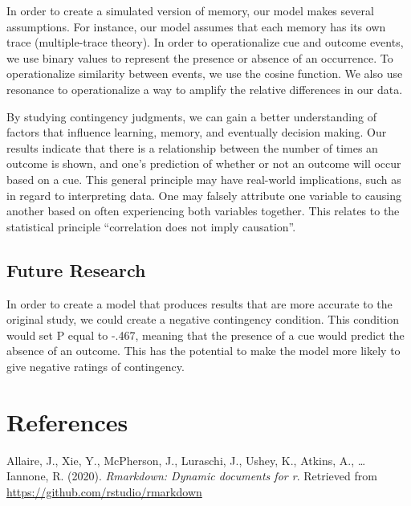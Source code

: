 \documentclass[
  english,
  man,floatsintext]{apa6}
\begin{document}
In order to create a simulated version of memory, our model makes several assumptions. For instance, our model assumes that each memory has its own trace (multiple-trace theory). In order to operationalize cue and outcome events, we use binary values to represent the presence or absence of an occurrence. To operationalize similarity between events, we use the cosine function. We also use resonance to operationalize a way to amplify the relative differences in our data.

By studying contingency judgments, we can gain a better understanding of factors that influence learning, memory, and eventually decision making. Our results indicate that there is a relationship between the number of times an outcome is shown, and one's prediction of whether or not an outcome will occur based on a cue. This general principle may have real-world implications, such as in regard to interpreting data. One may falsely attribute one variable to causing another based on often experiencing both variables together. This relates to the statistical principle \enquote{correlation does not imply causation}.

\hypertarget{future-research}{%
\subsection{Future Research}\label{future-research}}

In order to create a model that produces results that are more accurate to the original study, we could create a negative contingency condition. This condition would set P equal to -.467, meaning that the presence of a cue would predict the absence of an outcome. This has the potential to make the model more likely to give negative ratings of contingency.

\newpage

\hypertarget{references}{%
\section{References}\label{references}}

\begingroup
\setlength{\parindent}{-0.5in}
\setlength{\leftskip}{0.5in}

\hypertarget{refs}{}
\leavevmode\hypertarget{ref-R-rmarkdown}{}%
Allaire, J., Xie, Y., McPherson, J., Luraschi, J., Ushey, K., Atkins, A., \ldots{} Iannone, R. (2020). \emph{Rmarkdown: Dynamic documents for r}. Retrieved from \url{https://github.com/rstudio/rmarkdown}
\end{document}

